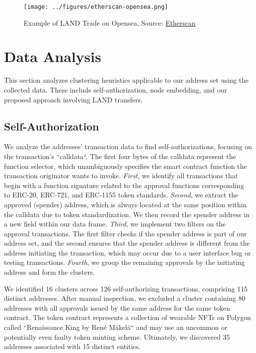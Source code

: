 \documentclass[12pt,a4paper,titlepage,oneside,english]{article}
\begin{document}
\begin{figure}[h!]
	\centering
	\texttt{[image: ../figures/etherscan-opensea.png]}
	\caption{Example of LAND Trade on Opensea, Source: \href{https://etherscan.io/tx/0x2c2a70114e9080596bf5da6ad9c9b9f6d7e4c85a9d3b06e992f7248f9457a2ec}{Etherscan}}
	\label{fig:LAND_example}
\end{figure}


\section{Data Analysis}
This section analyzes clustering heuristics applicable to our address set using the collected data. These include self-authorization, node embedding, and our proposed approach involving LAND transfers.

\subsection{Self-Authorization}
We analyze the addresses' transaction data to find self-authorizations, focusing on the transaction's ``calldata``. The first four bytes of the calldata represent the function selector, which unambiguously specifies the smart contract function the transaction originator wants to invoke. \newline
\textit{First}, we identify all transactions that begin with a function signature related to the approval functions corresponding to ERC-20, ERC-721, and ERC-1155 token standards. \textit{Second}, we extract the approved (spender) address, which is always located at the same position within the calldata due to token standardization. We then record the spender address in a new field within our data frame. \textit{Third}, we implement two filters on the approval transactions. The first filter checks if the spender address is part of our address set, and the second ensures that the spender address is different from the address initiating the transaction, which may occur due to a user interface bug or testing transactions. \textit{Fourth}, we group the remaining approvals by the initiating address and form the clusters.

We identified 16 clusters across 126 self-authorizing transactions, comprising 115 distinct addresses. After manual inspection, we excluded a cluster containing 80 addresses with all approvals issued by the same address for the same token contract. The token contract represents a collection of wearable NFTs on Polygon called ``Renaissance King by René Mäkelä`` and may use an uncommon or potentially even faulty token minting scheme. Ultimately, we discovered 35 addresses associated with 15 distinct entities.
\end{document}
